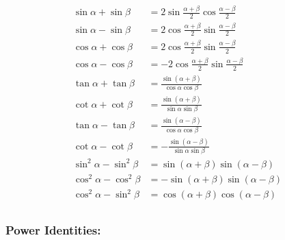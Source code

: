 \documentclass[
]{book}
\begin{document}
\begin{align}
\sin{\alpha} + \sin{\beta} &=  2\sin{\frac{\alpha + \beta}{2}}\cos{\frac{\alpha - \beta}{2}}\\
\sin{\alpha} - \sin{\beta} &=  2\cos{\frac{\alpha + \beta}{2}}\sin{\frac{\alpha - \beta}{2}}\\
\cos{\alpha} + \cos{\beta} &=  2\cos{\frac{\alpha + \beta}{2}}\sin{\frac{\alpha - \beta}{2}}\\
\cos{\alpha} - \cos{\beta} &= -2\cos{\frac{\alpha + \beta}{2}}\sin{\frac{\alpha - \beta}{2}}\\
\tan{\alpha} + \tan{\beta} &=  \frac{\sin\left(\alpha + \beta\right)}{\cos{\alpha}\cos{\beta}}\\
\cot{\alpha} + \cot{\beta} &=  \frac{\sin\left(\alpha + \beta\right)}{\sin{\alpha}\sin{\beta}}\\
\tan{\alpha} - \tan{\beta} &=  \frac{\sin\left(\alpha - \beta\right)}{\cos{\alpha}\cos{\beta}}\\
\cot{\alpha} - \cot{\beta} &= -\frac{\sin\left(\alpha - \beta\right)}{\sin{\alpha}\sin{\beta}}\\
\sin^2{\alpha} - \sin^2{\beta} &=  \sin\left(\alpha + \beta\right) \sin\left(\alpha - \beta\right)\\
\cos^2{\alpha} - \cos^2{\beta} &= -\sin\left(\alpha + \beta\right) \sin\left(\alpha - \beta\right)\\
\cos^2{\alpha} - \sin^2{\beta} &=  \cos\left(\alpha + \beta\right) \cos\left(\alpha - \beta\right)\\
\end{align}

\hypertarget{power-identities}{%
\subsubsection*{Power Identities:}\label{power-identities}}
\end{document}

